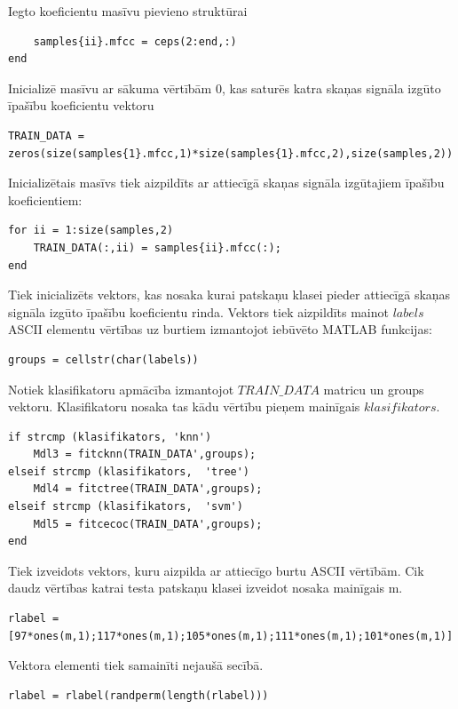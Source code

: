 \documentclass[12pt,paper=A4]{report}
\begin{document}
   
Iegto koeficientu masīvu pievieno struktūrai 
\begin{lstlisting}
    samples{ii}.mfcc = ceps(2:end,:)
end
\end{lstlisting}
    
    
Inicializē masīvu ar sākuma vērtībām 0, kas saturēs katra skaņas signāla izgūto īpašību koeficientu vektoru 
\begin{lstlisting}
TRAIN_DATA = zeros(size(samples{1}.mfcc,1)*size(samples{1}.mfcc,2),size(samples,2))
\end{lstlisting}


Inicializētais masīvs tiek aizpildīts ar attiecīgā skaņas signāla izgūtajiem īpašību koeficientiem:
\begin{lstlisting}
for ii = 1:size(samples,2)
    TRAIN_DATA(:,ii) = samples{ii}.mfcc(:);
end
\end{lstlisting}



Tiek inicializēts vektors, kas nosaka kurai patskaņu klasei pieder attiecīgā skaņas signāla izgūto īpašību koeficientu rinda. Vektors tiek aizpildīts mainot $labels$ ASCII elementu vērtības uz burtiem izmantojot iebūvēto MATLAB funkcijas:
\begin{lstlisting}
groups = cellstr(char(labels))
\end{lstlisting}


Notiek klasifikatoru apmācība izmantojot $TRAIN\_DATA$ matricu un groups vektoru. Klasifikatoru nosaka tas kādu vērtību pieņem mainīgais $klasifikators$.
\begin{lstlisting}
if strcmp (klasifikators, 'knn')
    Mdl3 = fitcknn(TRAIN_DATA',groups);
elseif strcmp (klasifikators,  'tree')
    Mdl4 = fitctree(TRAIN_DATA',groups);
elseif strcmp (klasifikators,  'svm')
    Mdl5 = fitcecoc(TRAIN_DATA',groups);
end
\end{lstlisting}


 
Tiek izveidots vektors, kuru aizpilda ar attiecīgo burtu ASCII vērtībām. Cik daudz vērtības katrai testa patskaņu klasei izveidot nosaka mainīgais m.
\begin{lstlisting}
rlabel = [97*ones(m,1);117*ones(m,1);105*ones(m,1);111*ones(m,1);101*ones(m,1)]
\end{lstlisting}


Vektora elementi tiek samainīti nejaušā secībā.
\begin{lstlisting}
rlabel = rlabel(randperm(length(rlabel)))
\end{lstlisting}
\end{document}
